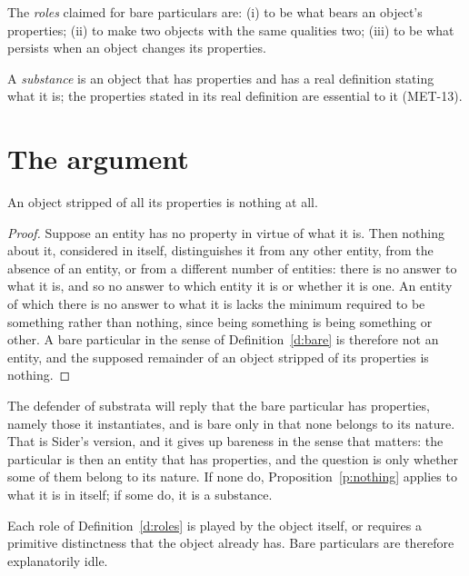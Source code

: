 \documentclass{situationist-preprint}
\begin{document}
\begin{definition}\label{d:roles}
The \emph{roles} claimed for bare particulars are: (i) to be what bears an object's properties; (ii) to make two objects with the same qualities two; (iii) to be what persists when an object changes its properties.
\end{definition}

\begin{definition}\label{d:substance}
A \emph{substance} is an object that has properties and has a real definition stating what it is; the properties stated in its real definition are essential to it (MET-13).
\end{definition}

\section{The argument}

\begin{proposition}\label{p:nothing}
An object stripped of all its properties is nothing at all.
\end{proposition}

\begin{proof}
Suppose an entity has no property in virtue of what it is. Then nothing about it, considered in itself, distinguishes it from any other entity, from the absence of an entity, or from a different number of entities: there is no answer to what it is, and so no answer to which entity it is or whether it is one. An entity of which there is no answer to what it is lacks the minimum required to be something rather than nothing, since being something is being something or other. A bare particular in the sense of Definition~\ref{d:bare} is therefore not an entity, and the supposed remainder of an object stripped of its properties is nothing.
\end{proof}

The defender of substrata will reply that the bare particular has properties, namely those it instantiates, and is bare only in that none belongs to its nature. That is Sider's version, and it gives up bareness in the sense that matters: the particular is then an entity that has properties, and the question is only whether some of them belong to its nature. If none do, Proposition~\ref{p:nothing} applies to what it is in itself; if some do, it is a substance.

\begin{proposition}\label{p:idle}
Each role of Definition~\ref{d:roles} is played by the object itself, or requires a primitive distinctness that the object already has. Bare particulars are therefore explanatorily idle.
\end{proposition}
\end{document}
